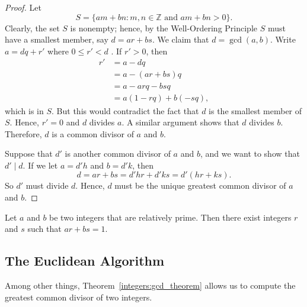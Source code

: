 \begin{proof} %
Let
\[
S = \{ am + bn : m, n \in {\mathbb Z} \text{ and } am + bn	> 0 \}.
\]
Clearly, the set $S$ is nonempty; hence, by the Well-Ordering Principle $S$ must have a smallest member, say $d = ar + bs$.  We claim that $d = \gcd( a, b)$.  Write $a = dq + r'$ where $0 \leq r' < d$ . If $r '> 0$, then %
\begin{align*}
r '
& = a - dq \\
& = a - (ar + bs)q \\
& = a - arq - bsq \\
& = a( 1 - rq ) + b( -sq ),
\end{align*}
which is in $S$.  But this would contradict the fact that $d$ is the smallest member of $S$.  Hence, $r' = 0$ and $d$ divides $a$.  A similar argument shows that $d$ divides $b$.  Therefore, $d$ is a common divisor of $a$ and $b$.

Suppose that $d'$ is another common divisor of $a$ and $b$, and we want to show that $d' \mid d$. If we let $a = d'h$ and $b = d'k$, then
\[
d = ar + bs = d'hr + d'ks = d'(hr + ks).
\]
So $d'$ must divide $d$. Hence, $d$ must be the unique greatest common divisor of $a$ and $b$. 
\end{proof}

\begin{corollary}\label{integers:coprime_corollary}
Let $a$ and $b$ be two integers that are relatively prime. Then there exist  integers $r$ and $s$ such that $ar + bs = 1$. 
\end{corollary}
 
 
\subsection*{The Euclidean Algorithm}

Among other things, Theorem~\ref{integers:gcd_theorem} allows us to compute the greatest common divisor of two integers. 

\medskip

